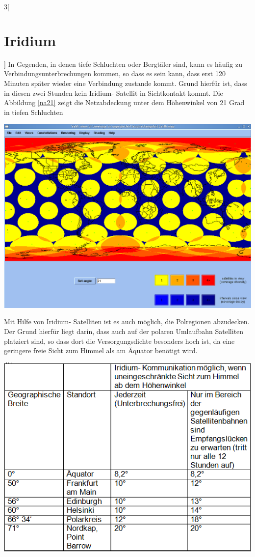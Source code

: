 \begin{multicols}{3}[\section{Iridium}]
In Gegenden, in denen tiefe Schluchten oder Bergtäler sind, kann es häufig zu Verbindungsunterbrechungen kommen, so dass es sein kann, dass erst 120 Minuten später wieder eine Verbindung zustande kommt. Grund hierfür ist, dass in diesen zwei Stunden kein Iridium- Satellit in Sichtkontakt kommt.
Die Abbildung \ref{na21} zeigt die Netzabdeckung unter dem Höhenwinkel von 21 Grad in tiefen Schluchten 
\begin{Figure}
	\includegraphics[width=\linewidth]{Kapitel/Iridium/Grafiken/netzabdeckung21.png}
	\label{na21}
\end{Figure}

Mit Hilfe von Iridium- Satelliten ist es auch möglich, die Polregionen abzudecken. Der Grund hierfür liegt darin, dass auch auf der polaren Umlaufbahn Satelliten platziert sind, so dass dort die Versorgungsdichte besonders hoch ist, da eine geringere freie Sicht zum Himmel als am Äquator benötigt wird.

\begin{Figure}
	\includegraphics[width=\linewidth]{Kapitel/Iridium/Grafiken/hoehenwinkel.png}
	\label{fig:hw}
\end{Figure}


\end{multicols}
